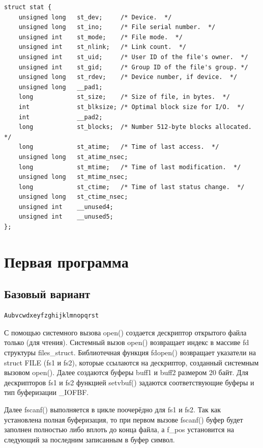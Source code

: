 \documentclass[a4paper,14pt]{extarticle}
\begin{document}
\begin{lstlisting}[caption={\text{struct stat}}]
struct stat {
	unsigned long	st_dev;		/* Device.  */
	unsigned long	st_ino;		/* File serial number.  */
	unsigned int	st_mode;	/* File mode.  */
	unsigned int	st_nlink;	/* Link count.  */
	unsigned int	st_uid;		/* User ID of the file's owner.  */
	unsigned int	st_gid;		/* Group ID of the file's group. */
	unsigned long	st_rdev;	/* Device number, if device.  */
	unsigned long	__pad1;
	long		    st_size;	/* Size of file, in bytes.  */
	int		        st_blksize;	/* Optimal block size for I/O.  */
	int		        __pad2;
	long		    st_blocks;	/* Number 512-byte blocks allocated. */
	long		    st_atime;	/* Time of last access.  */
	unsigned long	st_atime_nsec;
	long		    st_mtime;	/* Time of last modification.  */
	unsigned long	st_mtime_nsec;
	long		    st_ctime;	/* Time of last status change.  */
	unsigned long	st_ctime_nsec;
	unsigned int	__unused4;
	unsigned int	__unused5;
};
\end{lstlisting}



\section{Первая программа}

\subsection{Базовый вариант}



\begin{lstlisting}[caption={\text{Вывод программы}}]
Aubvcwdxeyfzghijklmnopqrst
\end{lstlisting}

С помощью системного вызова open() создается дескриптор открытого файла только (для чтения). Системный вызов open() возвращает индекс в массиве fd структуры files\_struct.  Библиотечная функция fdopen() возвращает указатели на struct FILE (fs1 и fs2), которые ссылаются на дескриптор, созданный системным вызовом open(). Далее создаются буферы buff1 и buff2 размером 20 байт. Для дескрипторов fs1 и fs2 функцией setvbuf() задаются соответствующие буферы и тип буферизации \_IOFBF.

Далее fscanf() выполняется в цикле поочерёдно для fs1 и fs2. Так как установлена полная буферизация, то при первом вызове fscanf() буфер будет заполнен полностью либо вплоть до конца файла, а f\_pos установится на следующий за последним записанным в буфер символ.
\end{document}

